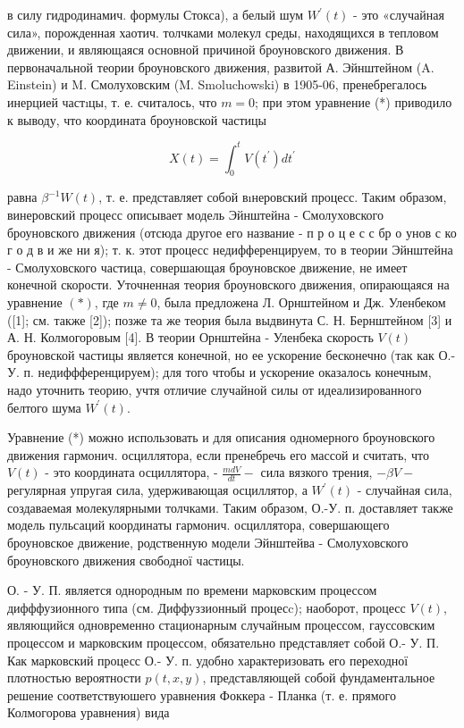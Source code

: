 \documentclass[10pt]{article}
\begin{document}
в силу гидродинамич. формулы Стокса), а белый шум $W^{\prime}(t)$ - это «случайная сила», порожденная хаотич. толчками молекул среды, находящихся в тепловом движении, и являющаяся основной причиной броуновского движения. В первоначальной теории броуновского движения, развитой А. Эйнштейном (A. Einstein) и M. Смолуховским (M. Smoluchowski) в 1905-06, пренебрегалось инерцией частıцы, т. е. считалось, что $m=0$; при этом уравнение (*) приводило к выводу, что координата броуновской частицы



\[

X(t)=\int_{0}^{t} V\left(t^{\prime}\right) d t^{\prime}

\]



равна $\beta^{-1} W(t)$, т. е. представляет собой вıнеровский процесс. Таким образом, винеровский процесс описывает модель Эйнштейна - Смолуховского броуновского движения (отсюда другое его название - п р о ц е с с бр о унов с ко г о д в и же ни я); т. к. этот процесс недифференцируем, то в теории Эйнштейна - Смолуховского частица, совершающая броуновское движение, не имеет конечной скорости. Уточненная теория броуновского движения, опирающаяся на уравнение $(*)$, где $m \neq 0$, была предложена Л. Орнштейном и Дж. Уленбеком ([1]; см. также [2]); позже та же теория была выдвинута С. Н. Бернштейном [3] и А. Н. Колмогоровым [4]. В теории Орнштейна - Уленбека скорость $V(t)$ броуновской частицы является конечной, но ее ускорение бесконечно (так как О.-У. п. недиффференцируем); для того чтобы и ускорение оказалось конечным, надо уточнить теорию, учтя отличие случайной силы от идеализированного белтого шума $W^{\prime}(t)$.



Уравнение (*) можно использовать и для описания одномерного броуновского движения гармонич. осциллятора, если пренебречь его массой и считать, что $V(t)$ - это координата осциллятора, - $\frac{m d V}{d t}-$ сила вязкого трения, $-\beta V-$ регулярная упругая сила, удерживающая осциллятор, а $W^{\prime}(t)$ - случайная сила, создаваемая молекулярными толчками. Таким образом, О.-У. п. доставляет также модель пульсаций координаты гармонич. осциллятора, совершающего броуновское движение, родственную модели Эйнштейва - Смолуховского броуновского движения свободної частицы.



О. - У. П. является однородным по времени марковским процессом дифффузионного типа (см. Диффуззионный процесc); наоборот, процесс $V(t)$, являющийся одновременно стационарным случайным процессом, гауссовским процессом и марковским процессом, обязательно представляет собой О.- У. П. Как марковский процесс О.- У. п. удобно характеризовать его переходної плотностью вероятности $p(t, x, y)$, представляющей собой фундаментальное решение соответствуюшего уравнения Фоккера - Планка (т. е. прямого Колмогорова уравнения) вида
\end{document}
